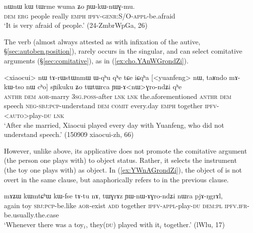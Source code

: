 \begin{exe}
\ex \label{ex:YWkWnWGmu}
\gll nɯnɯ kɯ tɯrme wuma ʑo ɲɯ-kɯ-nɯɣ-mu. \\
\textsc{dem} \textsc{erg} people really \textsc{emph} \textsc{ipfv}-\textsc{genr}:S/O-\textsc{appl}-be.afraid \\
\glt `It is very afraid of people.' (24-ZmbrWpGa, 26)
\end{exe}

The verb  (almost always attested as  with infixation of the autive, §\ref{sec:autoben.position}), rarely occurs in the singular, and can select comitative arguments (§\ref{sec:comitative}), as in (\ref{ex:cho.YAnWGrondZi}).

\begin{exe}
\ex \label{ex:cho.YAnWGrondZi}
\gll <xiaocui> nɯ tɤ-rɯstɯnmɯ ɯ-qʰu qʰe tɕe iɕqʰa [<yuanfeng> nɯ, taʁndo mɤ-kɯ-tso nɯ cʰo] sɲikuku ʑo tɯtɯrca ɲɯ-ɤ<nɯ>ɣro-ndʑi qʰe \\
\textsc{anthr} \textsc{dem} \textsc{aor}-marry \textsc{3sg}.\textsc{poss}-after \textsc{lnk} \textsc{lnk} the.aforementioned  \textsc{anthr} \textsc{dem} speech \textsc{neg}-\textsc{sbj}:\textsc{pcp}-understand \textsc{dem} \textsc{comit} every.day \textsc{emph} together \textsc{ipfv}-<\textsc{auto}>play-\textsc{du} \textsc{lnk} \\
\glt `After she married, Xiaocui played every day with Yuanfeng, who did not understand speech.' (150909 xiaocui-zh, 66)
\end{exe}

 However, unlike  above, its applicative  does not promote the comitative argument (the person one plays with) to object status. Rather, it selects the instrument (the toy one plays with) as object. In (\ref{ex:YWnAGrondZi}), the object of  is not overt in the same clause, but anaphorically refers to  in the previous clause.

\begin{exe}
\ex \label{ex:YWnAGrondZi}
\gll  mɤʑɯ kɯmtɕʰɯ kɯ-fse tɤ-tu nɤ, tɯɣrɤz ɲɯ-nɯ-ɤɣro-ndʑi nɯra pjɤ-ŋgrɤl,\\
again toy \textsc{sbj}:\textsc{pcp}-be.like \textsc{aor}-exist \textsc{add} together \textsc{ipfv}-\textsc{appl}-play-\textsc{du} \textsc{dem}:\textsc{pl} \textsc{ipfv}.\textsc{ifr}-be.usually.the.case \\
\glt `Whenever there was a toy$_i$, they(\textsc{du}) played with it$_i$ together.' (lWlu, 17)
\end{exe}

